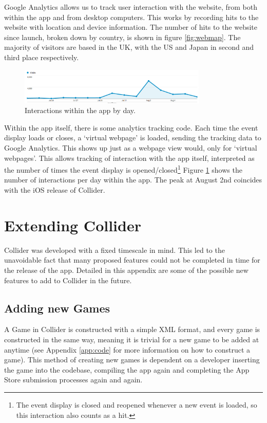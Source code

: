 \documentclass[12pt]{article}
\begin{document}
Google Analytics allows us to track user interaction with the website, from both within the app and from desktop computers. This works by recording hits to the website with location and device information.
The number of hits to the website since launch, broken down by country, is shown in figure \ref{fig:webmap}. The majority of visitors are based in the UK, with the US and Japan in second and third place respectively.

\begin{figure}
\centering
    \includegraphics[width=0.8\textwidth]{img/apphits.png}
    \caption{\label{fig:apphits}Interactions within the app by day.}
\end{figure}

Within the app itself, there is some analytics tracking code. Each time the event display loads or closes, a `virtual webpage' is loaded, sending the tracking data to Google Analytics. This shows up just as a webpage view would, only for `virtual webpages'. This allows tracking of interaction with the app itself, interpreted as the number of times the event display is opened/closed\footnote{The event display is closed and reopened whenever a new event is loaded, so this interaction also counts as a hit.}
Figure \ref{fig:apphits} shows the number of interactions per day within the app. The peak at August 2nd coincides with the iOS release of Collider.

\appendix
\section{Extending Collider}
Collider was developed with a fixed timescale in mind. This led to the unavoidable fact that many proposed features could not be completed in time for the release of the app. Detailed in this appendix are some of the possible new features to add to Collider in the future.

\subsection{Adding new Games}
A Game in Collider is constructed with a simple XML format, and every game is constructed in the same way, meaning it is trivial for 
a new game to be added at anytime (see Appendix \ref{app:code} for more information on how to construct a game).
This method of creating new games is dependent on a developer inserting the game into the codebase, compiling the app again and completing the App Store submission processes again and again.
\end{document}
